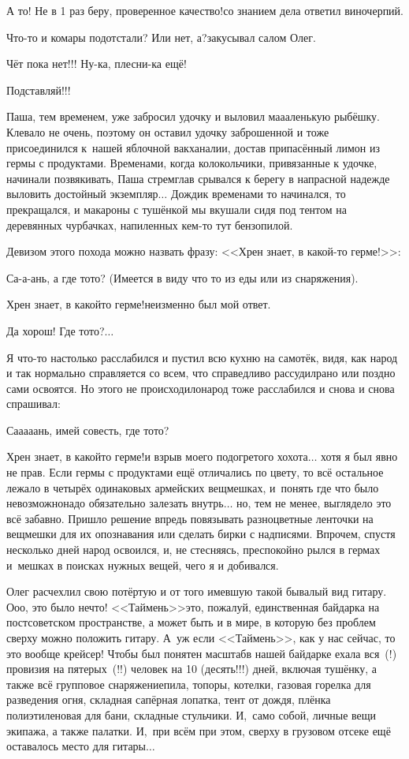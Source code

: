 \diagdash А то! Не в 1 раз беру, проверенное качество!\mdash со знанием дела ответил виночерпий.

\diagdash Что-то и комары подотстали? Или нет, а?\mdash закусывал салом Олег.

\diagdash Чёт пока нет!!! Ну-ка, плесни-ка ещё!

\diagdash Подставляй!!!

Паша, тем временем, уже забросил удочку и выловил ма\sdash а\sdash аленькую рыбёшку. Клевало не очень, поэтому он оставил удочку заброшенной и тоже присоединился к~нашей яблочной вакханалии, достав припасённый лимон из гермы с продуктами. Временами, когда колокольчики, привязанные к удочке, начинали позвякивать, Паша стремглав срывался к берегу в напрасной надежде выловить достойный экземпляр$\ldots$ Дождик временами то начинался, то прекращался, и макароны с тушёнкой мы вкушали сидя под тентом на деревянных чурбачках, напиленных кем-то тут бензопилой. 

Девизом этого похода можно назвать фразу: <<Хрен знает, в какой-то герме!>>:

\diagdash Са-а-ань, а где то\sdash то? (Имеется в виду что то из еды или из снаряжения). 

\diagdash Хрен знает, в какой\sdash то герме!\mdash неизменно был мой ответ. 

\diagdash Да хорош! Где то\sdash то?$\ldots$

Я что-то настолько расслабился и пустил всю кухню на самотёк, видя, как народ и так нормально справляется со всем, что справедливо рассудил\mdash рано или поздно сами освоятся. Но этого не происходило\mdash народ тоже расслабился и снова и снова спрашивал: 

\diagdash Са\sdash а\sdash а\sdash а\sdash ань, имей совесть, где то\sdash то? 

\diagdash Хрен знает, в какой\sdash то герме!\mdash и взрыв моего подогретого хохота$\ldots$ хотя я был явно не прав. Если гермы с продуктами ещё отличались по цвету, то всё остальное лежало в четырёх одинаковых армейских вещмешках, и~понять где что было невозможно\mdash надо обязательно залезать внутрь$\ldots$ но, тем не менее, выглядело это всё забавно. Пришло решение впредь повязывать разноцветные ленточки на вещмешки для их опознавания или сделать бирки с надписями. Впрочем, спустя несколько дней народ освоился, и, не стесняясь, преспокойно рылся в гермах и~мешках в поисках нужных вещей, чего я и добивался.

Олег расчехлил свою потёртую и от того имевшую такой бывалый вид гитару. О\sdash о\sdash о, это было нечто! <<Таймень>>\mdash это, пожалуй, единственная байдарка на постсоветском пространстве, а может быть и в мире, в которую без проблем сверху можно положить гитару. А~уж если <<Таймень>>, как у нас сейчас, то это вообще крейсер! Чтобы был понятен масштаб\mdash в нашей байдарке ехала вся~(!) провизия на пятерых~(!!) человек на 10 (десять!!!) дней, включая тушёнку, а также всё групповое снаряжение\mdash пила, топоры, котелки, газовая горелка для разведения огня, складная сапёрная лопатка, тент от дождя, плёнка полиэтиленовая для бани, складные стульчики. И,~само собой, личные вещи экипажа, а также палатки. И,~при всём при этом, сверху в грузовом отсеке ещё оставалось место для гитары$\ldots$

